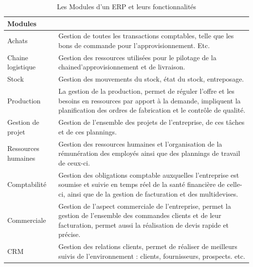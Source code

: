         \begin{table}[H]
        \begin{center}

        \begin{tabular}{|F{4cm}|R{10cm}|}
        \hline
        \textbf{Modules}  &  \\
        \hline
        Achats
        &
        Gestion de toutes les transactions comptables, telle que les bons de commande pour l’approvisionnement. Etc.\\

        \hline
        Chaine logistique
        &
        Gestion des ressources utilisées pour le pilotage de la chained’approvisionnement et de livraison.\\

        \hline
        Stock
        &
        Gestion des mouvements du stock, état du stock, entreposage.\\

        \hline
        Production
        &
        La gestion de la production, permet de réguler l’offre et les besoins en
        ressources par apport à la demande, impliquent la planification des ordres
        de fabrication et le contrôle de qualité.\\
        
        \hline
        Gestion de projet
        &
        Gestion de l’ensemble des projets de l’entreprise, de ces tâches et de ces plannings.\\

        \hline
        Ressources humaines
        &
        Gestion des ressources humaines et l’organisation de la rémunération des employés ainsi que des plannings de travail de ceux-ci.\\
        

        \hline
        Comptabilité
        &
        Gestion des obligations comptable auxquelles l’entreprise est soumise et suivie en temps réel de la santé financière de celle-ci, ainsi que de la gestion de facturation et des multidevises.\\

        \hline
        Commerciale
        &
        Gestion de l’aspect commerciale de l’entreprise, permet la gestion de l’ensemble des commandes clients et de leur facturation, permet aussi la réalisation de devis rapide et précise.\\

        \hline
        CRM
        &
        Gestion des relations clients, permet de réaliser de meilleurs suivis de
        l’environnement : clients, fournisseurs, prospects. etc.\\
 
        
        \hline
        \end{tabular}	
        \caption{Les Modules d'un ERP et leurs fonctionnalités}
            \end{center}
        \end{table}	


